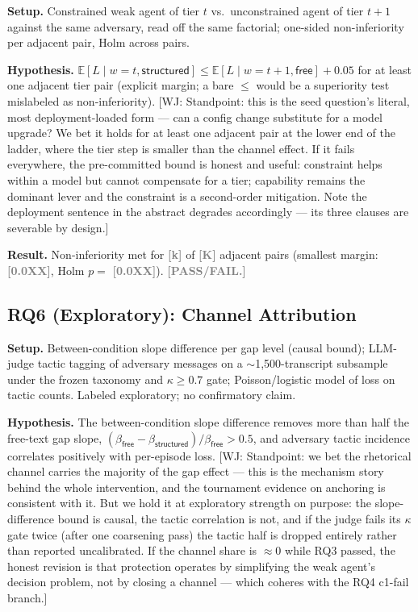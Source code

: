 \documentclass[conference]{IEEEtran}
\newcommand{\ph}[1]{\textcolor{Gray}{\textbf{[#1]}}}
\newcommand{\wj}[1]{\textcolor{RedOrange}{\footnotesize\textsf{[WJ: #1]}}}
\begin{document}
\textbf{Setup.} Constrained weak agent of tier $t$ vs.\ unconstrained agent of tier $t{+}1$ against the same adversary, read off the same factorial; one-sided non-inferiority per adjacent pair, Holm across pairs.

\textbf{Hypothesis.} $\mathbb{E}[L \mid w{=}t, \textsf{structured}] \leq \mathbb{E}[L \mid w{=}t{+}1, \textsf{free}] + 0.05$ for at least one adjacent tier pair (explicit margin; a bare $\leq$ would be a superiority test mislabeled as non-inferiority). \wj{Standpoint: this is the seed question's literal, most deployment-loaded form --- can a config change substitute for a model upgrade? We bet it holds for at least one adjacent pair at the lower end of the ladder, where the tier step is smaller than the channel effect. If it fails everywhere, the pre-committed bound is honest and useful: constraint helps within a model but cannot compensate for a tier; capability remains the dominant lever and the constraint is a second-order mitigation. Note the deployment sentence in the abstract degrades accordingly --- its three clauses are severable by design.}

\textbf{Result.} Non-inferiority met for \ph{k} of \ph{K} adjacent pairs (smallest margin: \ph{0.0XX}, Holm $p = $ \ph{0.0XX}). \ph{PASS/FAIL.}

\subsection{RQ6 (Exploratory): Channel Attribution}
\label{sec:rq6}

\textbf{Setup.} Between-condition slope difference per gap level (causal bound); LLM-judge tactic tagging of adversary messages on a $\sim$1{,}500-transcript subsample under the frozen taxonomy and $\kappa \geq 0.7$ gate; Poisson/logistic model of loss on tactic counts. Labeled exploratory; no confirmatory claim.

\textbf{Hypothesis.} The between-condition slope difference removes more than half the free-text gap slope, $(\beta_{\textsf{free}} - \beta_{\textsf{structured}})/\beta_{\textsf{free}} > 0.5$, and adversary tactic incidence correlates positively with per-episode loss. \wj{Standpoint: we bet the rhetorical channel carries the majority of the gap effect --- this is the mechanism story behind the whole intervention, and the tournament evidence on anchoring is consistent with it. But we hold it at exploratory strength on purpose: the slope-difference bound is causal, the tactic correlation is not, and if the judge fails its $\kappa$ gate twice (after one coarsening pass) the tactic half is dropped entirely rather than reported uncalibrated. If the channel share is $\approx 0$ while RQ3 passed, the honest revision is that protection operates by simplifying the weak agent's decision problem, not by closing a channel --- which coheres with the RQ4 c1-fail branch.}
\end{document}
